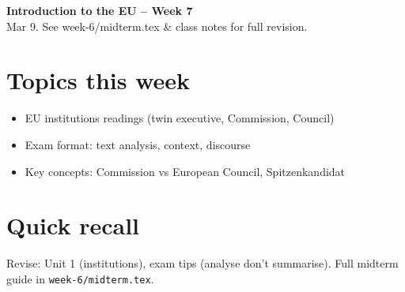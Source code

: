 \documentclass[10pt,a4paper]{article}
\begin{document}
\begin{center}
{\large\bfseries\color{eublue} Introduction to the EU -- Week 7}\\[0.2em]
\footnotesize Mar 9. See week-6/midterm.tex \& class notes for full revision.
\end{center}\vspace{0.5em}

\section*{\color{eublue}Topics this week}
\begin{itemize}
\item EU institutions readings (twin executive, Commission, Council)
\item Exam format: text analysis, context, discourse
\item Key concepts: Commission vs European Council, Spitzenkandidat
\end{itemize}

\section*{Quick recall}
Revise: Unit 1 (institutions), exam tips (analyse don't summarise). Full midterm guide in \texttt{week-6/midterm.tex}.
\end{document}
